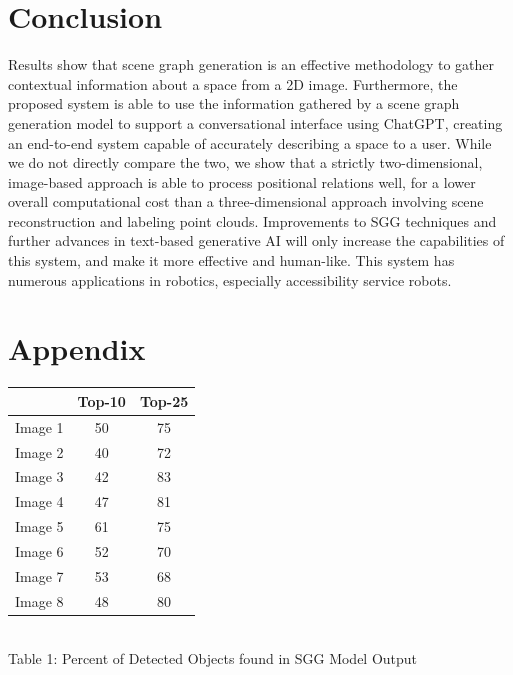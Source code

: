 \documentclass[letterpaper, 10 pt, conference]{ieeeconf}  %
\begin{document}
\section{Conclusion}
    Results show that scene graph generation is an effective methodology to gather contextual information about a space from a 2D image. Furthermore, the proposed system is able to use the information gathered by a scene graph generation model to support a conversational interface using ChatGPT, creating an end-to-end system capable of accurately describing a space to a user. While we do not directly compare the two, we show that a strictly two-dimensional, image-based approach is able to process positional relations well, for a lower overall computational cost than a three-dimensional approach involving scene reconstruction and labeling point clouds. Improvements to SGG techniques and further advances in text-based generative AI will only increase the capabilities of this system, and make it more effective and human-like. This system has numerous applications in robotics, especially accessibility service robots.

\section{Appendix}
\vspace*{3mm}
\centering
    \begin{tabular}{|c|c|c|}
        \hline
         & Top-10 & Top-25 \\
        \hline
        Image 1 & 50 & 75\\
        Image 2 & 40 & 72\\
        Image 3 & 42 & 83\\
        Image 4 & 47 & 81\\
        Image 5 & 61 & 75\\
        Image 6 & 52 & 70\\
        Image 7 & 53 & 68\\
        Image 8 & 48 & 80\\
        \hline

    \end{tabular}
    \\
    \vspace*{3mm}
    {Table 1: Percent of Detected Objects found in SGG Model Output}
    



\end{document}
